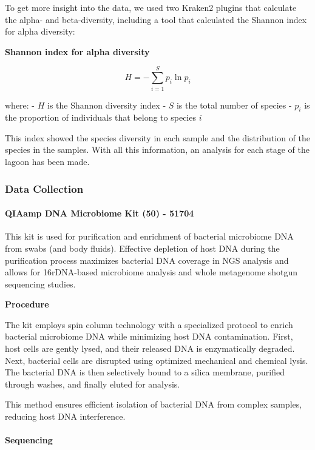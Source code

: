 \documentclass[
]{article}
\begin{document}
To get more insight into the data, we used two Kraken2 plugins that
calculate the alpha- and beta-diversity, including a tool that
calculated the Shannon index for alpha diversity:

\textbf{Shannon index for alpha diversity}

\[
H = -\sum_{i=1}^{S} p_i \ln p_i
\]

where: - \(H\) is the Shannon diversity index - \(S\) is the total
number of species - \(p_i\) is the proportion of individuals that belong
to species \(i\)

This index showed the species diversity in each sample and the
distribution of the species in the samples. With all this information,
an analysis for each stage of the lagoon has been made.

\hypertarget{data-collection}{%
\subsubsection{Data Collection}\label{data-collection}}

\hypertarget{qiaamp-dna-microbiome-kit-50---51704}{%
\paragraph{QIAamp DNA Microbiome Kit (50) -
51704}\label{qiaamp-dna-microbiome-kit-50---51704}}

This kit is used for purification and enrichment of bacterial microbiome
DNA from swabs (and body fluids). Effective depletion of host DNA during
the purification process maximizes bacterial DNA coverage in NGS
analysis and allows for 16rDNA-based microbiome analysis and whole
metagenome shotgun sequencing studies.

\textbf{Procedure}

The kit employs spin column technology with a specialized protocol to
enrich bacterial microbiome DNA while minimizing host DNA contamination.
First, host cells are gently lysed, and their released DNA is
enzymatically degraded. Next, bacterial cells are disrupted using
optimized mechanical and chemical lysis. The bacterial DNA is then
selectively bound to a silica membrane, purified through washes, and
finally eluted for analysis.

This method ensures efficient isolation of bacterial DNA from complex
samples, reducing host DNA interference.

\hypertarget{sequencing}{%
\paragraph{Sequencing}\label{sequencing}}
\end{document}
